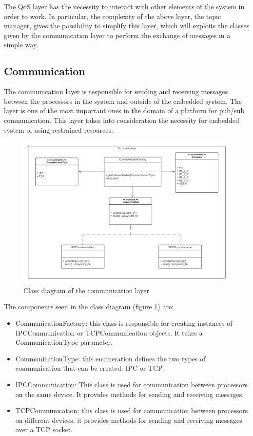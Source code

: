 The QoS layer has the necessity to interact with other elements of the system
in order to work. In particular, the complexity of the above layer, the topic
manager, gives the possibility to simplify this layer, which will exploits
the classes given by the communication layer to perform the exchange of
messages in a simple way.

\subsection{Communication}

The communication layer is responsible for sending and receiving messages
between the processors in the system and outside of the embedded system.
The layer is one of the most important ones in the domain of a
platform for pub/sub communication. This layer takes into consideration the
necessity for embedded system of using restrained resources.

\begin{figure}[H]
    \centering
    \includegraphics[width=1.0\textwidth]{Figures/class_diagram_communication.png}
    \caption{Class diagram of the communication layer}
    \label{fig:class_diagram_communication}
\end{figure}

The components seen in the class diagram
(figure \ref{fig:class_diagram_communication}) are:

\begin{itemize}
    \item   CommunicationFactory: this class is responsible for creating
            instances of IPCCommunication or TCPCommunication objects. It takes
            a CommunicationType parameter.
    \item   CommunicationType: this enumeration defines the two types of
            communication that can be created: IPC or TCP.
    \item   IPCCommunication: This class is used for communication between
            processors on the same device. It provides methods for sending and
            receiving messages.
    \item   TCPCommunication: this class is used for communication between
            processors on different devices. it provides methods for sending
            and receiving messages over a TCP socket.
\end{itemize}

